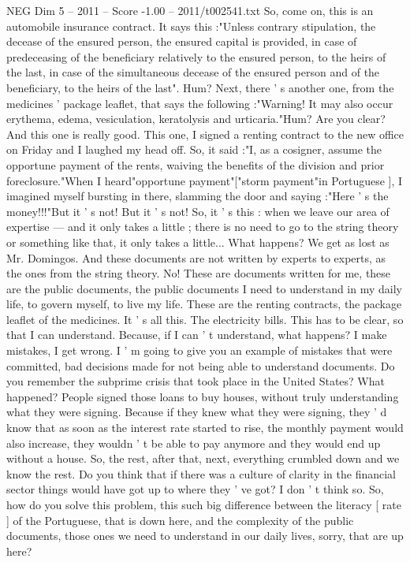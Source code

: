 \begin{textsample}{NEG Dim 5 – 2011 – Score -1.00 – 2011/t002541.txt}
So, come on, this is an automobile insurance contract.
It says this :"Unless contrary stipulation, the decease of the ensured person, the ensured capital is provided, in case of predeceasing of the beneficiary relatively to the ensured person, to the heirs of the last, in case of the simultaneous decease of the ensured person and of the beneficiary, to the heirs of the last".
Hum?
Next, there ' s another one, from the medicines ' package leaflet, that says the following :"Warning!
It may also occur erythema, edema, vesiculation, keratolysis and urticaria."Hum?
Are you clear?
And this one is really good.
This one, I signed a renting contract to the new office on Friday and I laughed my head off.
So, it said :"I, as a cosigner, assume the opportune payment of the rents, waiving the benefits of the division and prior foreclosure."When I heard"opportune payment"["storm payment"in Portuguese ], I imagined myself bursting in there, slamming the door and saying :"Here ' s the money!!!"But it ' s not!
But it ' s not!
So, it ' s this : when we leave our area of expertise — and it only takes a little ; there is no need to go to the string theory or something like that, it only takes a little...
What happens?
We get as lost as Mr.
Domingos.
And these documents are not written by experts to experts, as the ones from the string theory.
No!
These are documents written for me, these are the public documents, the public documents I need to understand in my daily life, to govern myself, to live my life.
These are the renting contracts, the package leaflet of the medicines.
It ' s all this.
The electricity bills.
This has to be clear, so that I can understand.
Because, if I can ' t understand, what happens?
I make mistakes, I get wrong.
I ' m going to give you an example of mistakes that were committed, bad decisions made for not being able to understand documents.
Do you remember the subprime crisis that took place in the United States?
What happened?
People signed those loans to buy houses, without truly understanding what they were signing.
Because if they knew what they were signing, they ' d know that as soon as the interest rate started to rise, the monthly payment would also increase, they wouldn ' t be able to pay anymore and they would end up without a house.
So, the rest, after that, next, everything crumbled down and we know the rest.
Do you think that if there was a culture of clarity in the financial sector things would have got up to where they ' ve got?
I don ' t think so.
So, how do you solve this problem, this such big difference between the literacy [ rate ] of the Portuguese, that is down here, and the complexity of the public documents, those ones we need to understand in our daily lives, sorry, that are up here?

\end{textsample}
